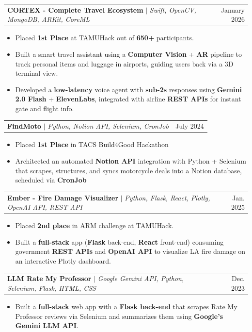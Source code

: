 \documentclass[letterpaper,10pt]{article}
\makeatletter
\newcommand{\resumeItem}[1]{
  \item\small{
    {#1 \vspace{-2pt}}
  }
}
\newcommand{\resumeProjectHeading}[2]{
    \item
    \begin{tabular*}{0.97\textwidth}{l@{\extracolsep{\fill}}r}
      \small#1 & #2 \\
    \end{tabular*}\vspace{-7pt}
}
\newcommand{\resumeItemListStart}{\begin{itemize}[itemsep=-2pt]}
\newcommand{\resumeItemListEnd}{\end{itemize}\vspace{-5pt}}
\makeatother
\begin{document}
    \resumeProjectHeading
          {\textbf{CORTEX - Complete Travel Ecosystem} $|$ \emph{Swift, OpenCV, MongoDB, ARKit, CoreML}}{January 2026}
          \resumeItemListStart
            \resumeItem{Placed \textbf{1st Place} at TAMUHack out of \textbf{650+} participants.}
            \resumeItem{Built a smart travel assistant using a \textbf{Computer Vision} + \textbf{AR} pipeline to track personal items and luggage in airports, guiding users back via a 3D terminal view.}
            \resumeItem{Developed a \textbf{low-latency} voice agent with \textbf{sub-2s} responses using \textbf{Gemini 2.0 Flash} + \textbf{ElevenLabs}, integrated with airline \textbf{REST APIs} for instant gate and flight info.}
          \resumeItemListEnd

    \resumeProjectHeading
          {\textbf{FindMoto} $|$ \emph{Python, Notion API, Selenium, CronJob}}{July 2024}
          \resumeItemListStart
            \resumeItem{Placed \textbf{1st Place} in TACS Build4Good Hackathon}
            \resumeItem{Architected an automated \textbf{Notion API} integration with Python + Selenium that scrapes, structures, and syncs motorcycle deals into a Notion database, scheduled via \textbf{CronJob}}
          \resumeItemListEnd

    \resumeProjectHeading
    {\textbf{Ember - Fire Damage Visualizer} $|$ \emph{Python, Flask, React, Plotly, OpenAI API, REST-API}}{Jan. 2025}
    \resumeItemListStart
      \resumeItem{Placed \textbf{2nd place} in ARM challenge at TAMUHack.}
      \resumeItem{Built a \textbf{full-stack} app (\textbf{Flask} back-end, \textbf{React} front-end) consuming government \textbf{REST APIs} and \textbf{OpenAI API} to visualize LA fire damage on an interactive Plotly dashboard.}
    \resumeItemListEnd

    \resumeProjectHeading
          {\textbf{LLM Rate My Professor} $|$ \emph{Google Gemini API, Python, Selenium, Flask, HTML, CSS}}{Dec. 2023}
          \resumeItemListStart
            \resumeItem{Built a \textbf{full-stack} web app with a \textbf{Flask back-end} that scrapes Rate My Professor reviews via Selenium and summarizes them using \textbf{Google's Gemini LLM API}.}
          \resumeItemListEnd


    

\end{document}
